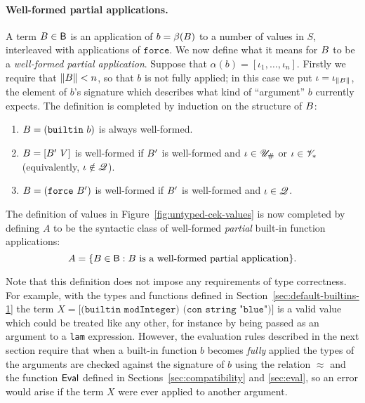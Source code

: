 \paragraph{Well-formed partial applications.} A term $B \in \mathsf{B}$ is
an application of $b = \beta(B)$ to a number of values in $S$, interleaved
with applications of $\texttt{force}$.  We now define what it means for $B$
to be a \textit{well-formed partial application}.  Suppose that $\alpha(b) =
[\iota_1, \ldots, \iota_n]$. Firstly we require that $\lVert B \rVert < n$, so
that $b$ is not fully applied; in this case we put
$\iota=\iota_{\lVert B \rVert}$, the element of $b$'s signature which describes
what kind of ``argument'' $b$ currently expects.  The definition is completed by
induction on the structure of $B$:
\begin{enumerate}
\item $B=\mathtt{(builtin}\ b \mathtt{)}$ is always well-formed.
\item $\pba=\mathtt{[}\pba'\ V\mathtt{]}$ is well-formed if $B'$ is
  well-formed and $\iota \in {\mathscr{U}_{\#}}$ or $\iota \in \mathscr{V}_*$ (equivalently, $\iota \notin \mathscr{Q}$).
\item $\pba=\mathtt{(force}\ \pba'\mathtt{)}$ is well-formed if $B'$ is
  well-formed and $\iota \in \mathscr{Q}$.
\end{enumerate}



\medskip
\noindent The definition of values in Figure~\ref{fig:untyped-cek-values} is now
completed by defining $A$ to be the syntactic class of well-formed
\textit{partial} built-in function applications:
$$
A = \{B \in \mathsf{B}: B \text{ is a well-formed partial application} \}.
$$

\noindent Note that this definition does not impose any requirements of type
correctness.  For example, with the types and functions defined in
Section~\ref{sec:default-builtins-1} the term $X =\texttt{[(builtin
    modInteger) (con string "blue")]}$ is a valid value which could be
treated like any other, for instance by being passed as an argument to a
\texttt{lam} expression.  However, the evaluation rules described in the next
section require that when a built-in function $b$ becomes \textit{fully} applied
the types of the arguments are checked against the signature of $b$ using the
relation $\approx$ and the function $\mathsf{Eval}$ defined in
Sections~\ref{sec:compatibility} and \ref{sec:eval}, so an error would arise if
the term $X$ were ever applied to another argument.
